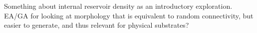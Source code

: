 Something about internal reservoir density as an introductory exploration. EA/GA
for looking at morphology that is equivalent to random connectivity, but easier
to generate, and thus relevant for physical substrates?


